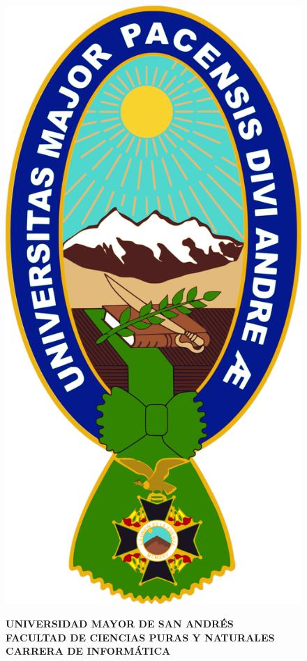\begin{figure}[ht]
  \centering
  \begin{minipage}{0.15\textwidth}
    \includegraphics[width=0.75\linewidth]{images/umsa.png}
  \end{minipage}
  \begin{minipage}{0.6\textwidth}
    \centering
    \textbf{
      UNIVERSIDAD MAYOR DE SAN ANDRÉS \\
      FACULTAD DE CIENCIAS PURAS Y NATURALES \\
      CARRERA DE INFORMÁTICA
    }
  \end{minipage}
  \begin{minipage}{0.2\textwidth}

\end{minipage}
\end{figure}
